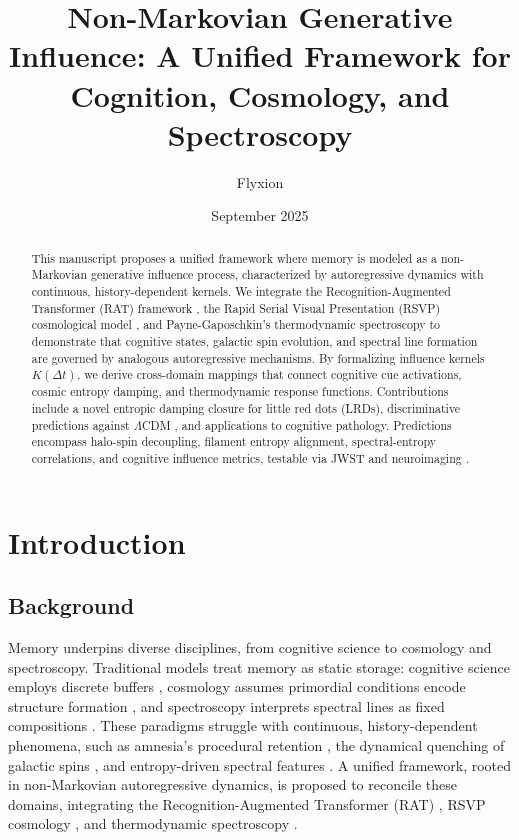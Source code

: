 \documentclass[12pt]{article}
\title{Non-Markovian Generative Influence: A Unified Framework for Cognition, Cosmology, and Spectroscopy}
\author{Flyxion}
\date{September 2025}
\begin{document}
\maketitle

\begin{abstract}
This manuscript proposes a unified framework where memory is modeled as a non-Markovian generative influence process, characterized by autoregressive dynamics with continuous, history-dependent kernels. We integrate the Recognition-Augmented Transformer (RAT) framework \citep{Barenholtz2025}, the Rapid Serial Visual Presentation (RSVP) cosmological model \citep{PacucciLoeb2025}, and Payne-Gaposchkin’s thermodynamic spectroscopy \citep{Payne1925} to demonstrate that cognitive states, galactic spin evolution, and spectral line formation are governed by analogous autoregressive mechanisms. By formalizing influence kernels $K(\Delta t)$, we derive cross-domain mappings that connect cognitive cue activations, cosmic entropy damping, and thermodynamic response functions. Contributions include a novel entropic damping closure for little red dots (LRDs), discriminative predictions against $\Lambda$CDM \citep{MoMaoWhite1998}, and applications to cognitive pathology. Predictions encompass halo-spin decoupling, filament entropy alignment, spectral-entropy correlations, and cognitive influence metrics, testable via JWST \citep{Kocevski2025} and neuroimaging \citep{Barenholtz2025}.
\end{abstract}

\section{Introduction}
\subsection{Background}
Memory underpins diverse disciplines, from cognitive science to cosmology and spectroscopy. Traditional models treat memory as static storage: cognitive science employs discrete buffers \citep{AtkinsonShiffrin1968}, cosmology assumes primordial conditions encode structure formation \citep{EisensteinLoeb1995}, and spectroscopy interprets spectral lines as fixed compositions \citep{Payne1925}. These paradigms struggle with continuous, history-dependent phenomena, such as amnesia’s procedural retention \citep{AtkinsonShiffrin1968}, the dynamical quenching of galactic spins \citep{PacucciLoeb2025}, and entropy-driven spectral features \citep{Maiolino2025}. A unified framework, rooted in non-Markovian autoregressive dynamics, is proposed to reconcile these domains, integrating the Recognition-Augmented Transformer (RAT) \citep{Barenholtz2025}, RSVP cosmology \citep{PacucciLoeb2025}, and thermodynamic spectroscopy \citep{Payne1925}.
\end{document}
